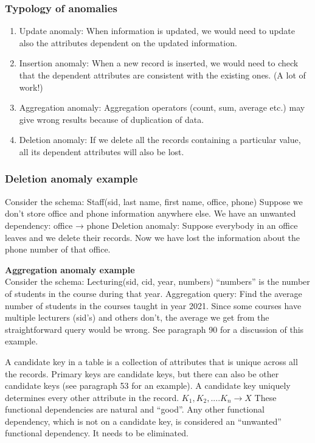 \subsubsection{Typology of anomalies} 
\begin{enumerate}
  \item Update anomaly:
When information is updated, we would need to update also the attributes dependent on the updated information.
  \item Insertion anomaly:
When a new record is inserted, we would need to check that the dependent attributes are consistent with the existing ones. (A lot of work!)
  \item Aggregation anomaly:
Aggregation operators (count, sum, average etc.) may give wrong results because of duplication of data.
  \item Deletion anomaly:
If we delete all the records containing a particular value, all its dependent attributes will also be lost.
\end{enumerate}

\subsubsection{Deletion anomaly example}
Consider the schema:
Staff(sid, last name, first name, office, phone)
Suppose we don't store office and phone information anywhere else.
We have an unwanted dependency: office → phone
Deletion anomaly: Suppose everybody in an office leaves and we delete their records. Now we have lost the information about the phone number of that office.


\textbf{Aggregation anomaly example} \\
Consider the schema:
Lecturing(sid, cid, year, numbers)
“numbers” is the number of students in the course during that year.
Aggregation query: Find the average number of students in the courses taught in year 2021.
Since some courses have multiple lecturers (sid's) and others don’t, the average we get from the straightforward query would be wrong. 
See paragraph 90 for a discussion of this example.

A candidate key in a table is a collection of attributes that is unique across all the records.
Primary keys are candidate keys, but there can also be other candidate keys (see paragraph 53 for an example).
A candidate key uniquely determines every other attribute in the record.
$K_1,K_2,....K_n \rightarrow X$
   These functional dependencies are natural and “good”. 
Any other functional dependency, which is not on a candidate key, is considered an “unwanted” functional dependency. It needs to be eliminated.


